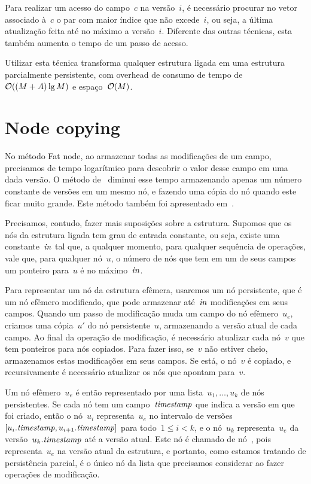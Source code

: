 \documentclass[../../main.tex]{subfiles}
\begin{document}
Para realizar um acesso do campo~$c$ na versão~$i$, é necessário procurar no vetor associado à~$c$ o par com maior índice que não excede~$i$, ou seja, a última atualização feita até no máximo a versão~$i$. Diferente das outras técnicas, esta também aumenta o tempo de um passo de acesso.

Utilizar esta técnica transforma qualquer estrutura ligada em uma estrutura parcialmente persistente, com overhead de consumo de tempo de~$\mathcal{O}((M+A) \lg{M})$ e espaço~$\mathcal{O}(M)$.

\section{Node copying}

No método Fat node, ao armazenar todas as modificações de um campo, precisamos de tempo logarítmico para descobrir o valor desse campo em uma dada versão. O método de~ diminui esse tempo armazenando apenas um número constante de versões em um mesmo nó, e fazendo uma cópia do nó quando este ficar muito grande. Este método também foi apresentado em~\cite{DriscollSST1989}.

Precisamos, contudo, fazer mais suposições sobre a estrutura. Supomos que os nós da estrutura ligada tem grau de entrada constante, ou seja, existe uma constante~$\mathit{in}$ tal que, a qualquer momento, para qualquer sequência de operações, vale que, para qualquer nó~$u$, o número de nós que tem em um de seus campos um ponteiro para~$u$ é no máximo~$\mathit{in}$.

Para representar um nó da estrutura efêmera, usaremos um nó persistente, que é um nó efêmero modificado, que pode armazenar até~$\mathit{in}$ modificações em seus campos. Quando um passo de modificação muda um campo do nó efêmero~$u_e$, criamos uma cópia~$u'$ do nó persistente~$u$, armazenando a versão atual de cada campo. Ao final da operação de modificação, é necessário atualizar cada nó~$v$ que tem ponteiros para nós copiados. Para fazer isso, se~$v$ não estiver cheio, armazenamos estas modificações em seus campos. Se está, o nó~$v$ é copiado, e recursivamente é necessário atualizar os nós que apontam para~$v$.

Um nó efêmero~$u_e$ é então representado por uma lista~$u_1, \ldots, u_k$ de nós persistentes. Se cada nó tem um campo~$\mathit{timestamp}$ que indica a versão em que foi criado, então o nó~$u_i$ representa~$u_e$ no intervalo de versões~$[u_i.\mathit{timestamp}, u_{i+1}.\mathit{timestamp}]$ para todo~$1 \leq i < k$, e o nó~$u_k$ representa~$u_e$ da versão~$u_k.\mathit{timestamp}$ até a versão atual. Este nó é chamado de nó~, pois representa~$u_e$ na versão atual da estrutura, e portanto, como estamos tratando de persistência parcial, é o único nó da lista que precisamos considerar ao fazer operações de modificação.
\end{document}
